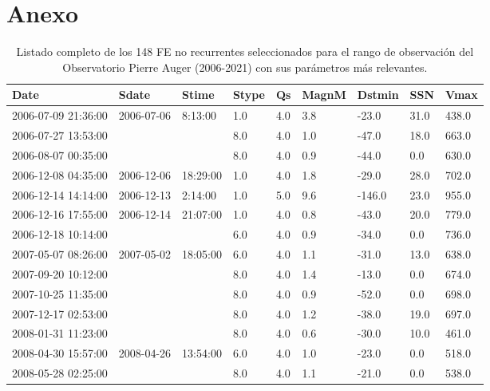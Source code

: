 \newpage
\chapter{Anexo}

\begin{longtable}{lllllllll}
\caption{Listado completo de los 148 FE no recurrentes seleccionados para el rango de observación del Observatorio Pierre Auger (2006-2021) con sus parámetros más relevantes.}\\
\toprule
\textbf{Date} & \textbf{Sdate} & \textbf{Stime} & \textbf{Stype} & \textbf{Qs} & \textbf{MagnM} & \textbf{Dstmin} & \textbf{SSN} & \textbf{Vmax} \\ 
\midrule
\endhead
2006-07-09 21:36:00 & 2006-07-06 & 8:13:00 & 1.0 & 4.0 & 3.8 & -23.0 & 31.0 & 438.0 \\ 
        2006-07-27 13:53:00 & ~ & ~ & 8.0 & 4.0 & 1.0 & -47.0 & 18.0 & 663.0 \\ 
        2006-08-07 00:35:00 & ~ & ~ & 8.0 & 4.0 & 0.9 & -44.0 & 0.0 & 630.0 \\ 
        2006-12-08 04:35:00 & 2006-12-06 & 18:29:00 & 1.0 & 4.0 & 1.8 & -29.0 & 28.0 & 702.0 \\ 
        2006-12-14 14:14:00 & 2006-12-13 & 2:14:00 & 1.0 & 5.0 & 9.6 & -146.0 & 23.0 & 955.0 \\ 
        2006-12-16 17:55:00 & 2006-12-14 & 21:07:00 & 1.0 & 4.0 & 0.8 & -43.0 & 20.0 & 779.0 \\ 
        2006-12-18 10:14:00 & ~ & ~ & 6.0 & 4.0 & 0.9 & -34.0 & 0.0 & 736.0 \\ 
        2007-05-07 08:26:00 & 2007-05-02 & 18:05:00 & 6.0 & 4.0 & 1.1 & -31.0 & 13.0 & 638.0 \\ 
        2007-09-20 10:12:00 & ~ & ~ & 8.0 & 4.0 & 1.4 & -13.0 & 0.0 & 674.0 \\ 
        2007-10-25 11:35:00 & ~ & ~ & 8.0 & 4.0 & 0.9 & -52.0 & 0.0 & 698.0 \\ 
        2007-12-17 02:53:00 & ~ & ~ & 8.0 & 4.0 & 1.2 & -38.0 & 19.0 & 697.0 \\ 
        2008-01-31 11:23:00 & ~ & ~ & 8.0 & 4.0 & 0.6 & -30.0 & 10.0 & 461.0 \\ 
        2008-04-30 15:57:00 & 2008-04-26 & 13:54:00 & 6.0 & 4.0 & 1.0 & -23.0 & 0.0 & 518.0 \\ 
        2008-05-28 02:25:00 & ~ & ~ & 8.0 & 4.0 & 1.1 & -21.0 & 0.0 & 538.0 \\ 

\end{longtable}
